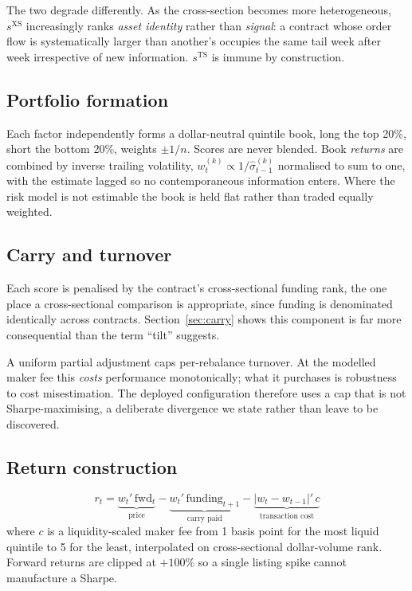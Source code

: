 \documentclass[11pt,letterpaper]{article}
\begin{document}
The two degrade differently. As the cross-section becomes more heterogeneous,
$s^{\mathrm{XS}}$ increasingly ranks \emph{asset identity} rather than
\emph{signal}: a contract whose order flow is systematically larger than
another's occupies the same tail week after week irrespective of new information.
$s^{\mathrm{TS}}$ is immune by construction.

\subsection{Portfolio formation}

Each factor independently forms a dollar-neutral quintile book, long the top
20\%, short the bottom 20\%, weights $\pm 1/n$. Scores are never blended. Book
\emph{returns} are combined by inverse trailing volatility,
$w^{(k)}_t \propto 1/\hat\sigma^{(k)}_{t-1}$ normalised to sum to one, with the
estimate lagged so no contemporaneous information enters. Where the risk model is
not estimable the book is held flat rather than traded equally weighted.

\subsection{Carry and turnover}

Each score is penalised by the contract's cross-sectional funding rank, the one
place a cross-sectional comparison is appropriate, since funding is denominated
identically across contracts. Section~\ref{sec:carry} shows this component is far
more consequential than the term ``tilt'' suggests.

A uniform partial adjustment caps per-rebalance turnover. At the modelled maker
fee this \emph{costs} performance monotonically; what it purchases is robustness
to cost misestimation. The deployed configuration therefore uses a cap that is
not Sharpe-maximising, a deliberate divergence we state rather than leave to be
discovered.

\subsection{Return construction}
\[
r_t = \underbrace{w_t' \, \mathrm{fwd}_t}_{\text{price}}
- \underbrace{w_t' \, \mathrm{funding}_{t+1}}_{\text{carry paid}}
- \underbrace{|w_t - w_{t-1}|' \, c}_{\text{transaction cost}}
\]
where $c$ is a liquidity-scaled maker fee from 1 basis point for the most liquid
quintile to 5 for the least, interpolated on cross-sectional dollar-volume rank.
Forward returns are clipped at $+100\%$ so a single listing spike cannot
manufacture a Sharpe.
\end{document}
